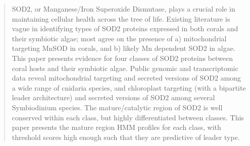 \begin{abstract}

SOD2, or Manganese/Iron Superoxide Dismutase, plays a crucial role in
maintaining cellular health across the tree of life. Existing literature is
vague in identifying types of SOD2 proteins expressed in both corals and their
symbiotic algae; most agree on the presence of a) mitochondrial targeting MnSOD
in corals, and b) likely Mn dependent SOD2 in algae. This paper presents
evidence for four classes of SOD2 proteins between coral hosts and their
symbiotic algae. Public genomic and transcriptomic data reveal mitochondrial
targeting and secreted versions of SOD2 among a wide range of cnidaria species,
and chloroplast targeting (with a bipartite leader architecture) and secreted
versions of SOD2 among several Symbiodinium species. The mature/catalytic
region of SOD2 is well conserved within each class, but highly differentiated
between classes. This paper presents the mature region HMM profiles for each
class, with threshold scores high enough such that they are predictive of
leader type.

\end{abstract}
